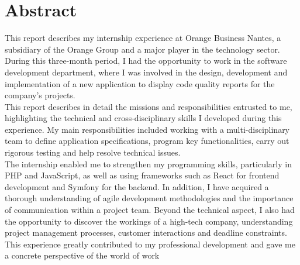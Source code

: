 \chapter*{Abstract}
\thispagestyle{empty}
This report describes my internship experience at Orange Business Nantes, a subsidiary of the Orange Group and a major player in the technology sector. During this three-month period, I had the opportunity to work in the software development department, where I was involved in the design, development and implementation of a new application to display code quality reports for the company's projects.\\

This report describes in detail the missions and responsibilities entrusted to me, highlighting the technical and cross-disciplinary skills I developed during this experience. My main responsibilities included working with a multi-disciplinary team to define application specifications, program key functionalities, carry out rigorous testing and help resolve technical issues.\\

The internship enabled me to strengthen my programming skills, particularly in PHP and JavaScript, as well as using frameworks such as React for frontend development and Symfony for the backend. In addition, I have acquired a thorough understanding of agile development methodologies and the importance of communication within a project team.
Beyond the technical aspect, I also had the opportunity to discover the workings of a high-tech company, understanding project management processes, customer interactions and deadline constraints. This experience greatly contributed to my professional development and gave me a concrete perspective of the world of work